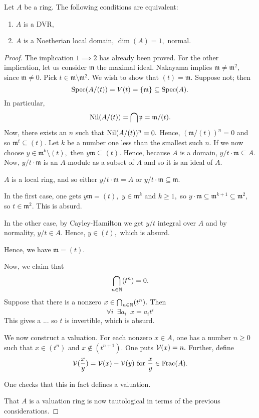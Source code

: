 \begin{theorem}
  \label{dvr noetherian}
  Let \(A\) be a ring. The following conditions are equivalent:
  \begin{enumerate}
  \item \(A\) is a DVR,
  \item \(A\) is a Noetherian local domain, \(\dim(A) = 1,\) normal.
  \end{enumerate}
\end{theorem}
\begin{proof}
  The implication \(1 \implies 2\) has already been proved.
  For the other implication, let us consider
  \(\mathfrak m\) the maximal ideal.
  Nakayama implies \(\mathfrak m \neq \mathfrak m^2,\) since \(\mathfrak m \neq 0.\)
  Pick \(t \in \mathfrak m \setminus \mathfrak m^2.\) We wish to show that \((t) = \mathfrak m.\)
  Suppose not; then
  \[\text{Spec}(A /{(t)}) = V(t) = \{\mathfrak m\} \subseteq \text{Spec}(A).\]
  In particular,
  \[\operatorname{Nil}(A / {(t)}) = \operatorname*{\bigcap} \mathfrak p = \mathfrak m /{(t)}.\]
  Now, there exists an \(n\) such that
  \(\operatorname{Nil}(A/{(t)})^n = 0.\)
  Hence,
  \((\mathfrak m / {(t)})^n = 0\)
  and so
  \(\mathfrak m^t \subseteq (t).\)
  Let \(k\) be a number one less than the smallest such \(n.\)
  If we now choose
  \(y \in \mathfrak m^k \setminus {(t)},\)
  then
  \(y \mathfrak m \subseteq (t).\)
  Hence, because \(A\) is a domain,
  \(y / {t} \cdot \mathfrak m \subseteq A.\)
  Now,
  \(y /{t} \cdot \mathfrak m\) is an \(A\)-module as a subset of \(A\) and so it is an ideal of \(A.\)

  \(A\) is a local ring, and so either
  \(y / {t} \cdot \mathfrak m = A\)
  or \(y /{t} \cdot \mathfrak m \subseteq \mathfrak m.\)

  In the first case, one gets
  \(y \mathfrak m = (t),\)
  \(y \in \mathfrak m^k\) and \(k \geq 1,\)
  so \(y \cdot \mathfrak m \subseteq \mathfrak m^{k+1} \subseteq \mathfrak m^2,\)
  so \(t \in \mathfrak m^2.\) This is absurd.

  In the other case, by Cayley-Hamilton
  we get \(y/{t}\) integral over \(A\) and by normality, \(y/{t} \in A\). Hence, \(y \in (t),\) which is absurd.

  Hence, we have \(\mathfrak m = (t).\)

  Now, we claim that
  \[\operatorname*{\bigcap}_{n \in \mathbb N} (t^n) = 0.\]
  Suppose that there is a nonzero \(x \in \operatorname*{\bigcap}_{n \in \mathbb N} (t^n).\)
  Then
  \[\forall i \enspace \exists a_i \enspace x = a_i t^i\]
  This gives a
  ...
  so \(t\) is invertible, which is absurd.

  We now construct a valuation. For each nonzero \(x \in A\), one has a number \(n \geq 0\) such that \(x \in (t^n)\) and \(x \notin (t^{n+1})\). One puts \(\mathcal V(x) = n.\)
  Further, define
  \[\mathcal V(\frac{x}{y}) = \mathcal V(x) - \mathcal V(y) \text{ for } \frac{x}{y} \in \mathrm{Frac}(A).\]

  One checks that this in fact defines a valuation.

  That \(A\) is a valuation ring is now tautological in terms of the previous considerations.
\end{proof}

